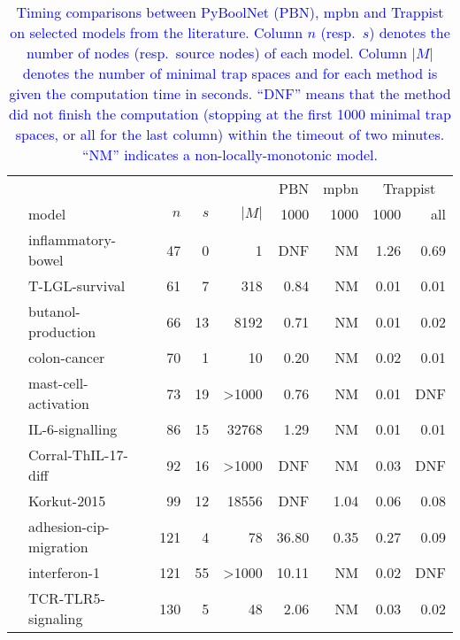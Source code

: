 \documentclass[runningheads]{llncs}
\newcounter{rownumber}
\newcommand\rownb{\stepcounter{rownumber}\arabic{rownumber}}
\newcommand{\revise}[1]{\textcolor{blue}{#1}}
\begin{document}
\begin{table}[!htb]
  \caption{\revise{Timing comparisons between PyBoolNet (PBN), mpbn and Trappist on selected models from the literature.
    Column \(n\) (resp.\ \(s\)) denotes the number of nodes (resp.\ source nodes) of each model. Column \(|M|\) denotes the number of minimal trap spaces and for each method is given the computation time in seconds.
    ``DNF'' means that the method did not finish the computation (stopping at the first 1000 minimal trap spaces, or all for the last column) within the timeout of two minutes. ``NM'' indicates a non-locally-monotonic model.}}
  \centering%
  \label{tab:result_real}
  \begin{tabular}{rlrrrrrrr}
    \toprule
    & & & & & PBN & mpbn & \multicolumn{2}{c}{Trappist} \\
    \cmidrule(lr){8-9}
    & model & \(n\) & \(s\) & \(|M|\) & 1000 & 1000 & 1000 & all \\
    \midrule
    \rownb & inflammatory-bowel~\cite{DBLP:journals/bmcsb/HelikarKMBRMWSLR12} & 47 & 0 & 1 & DNF & NM & 1.26 & 0.69\\
    \rownb & T-LGL-survival~\cite{DBLP:journals/bmcsb/HelikarKMBRMWSLR12} & 61 & 7 & 318 & 0.84 & NM & 0.01 & 0.01\\
    \rownb & butanol-production~\cite{DBLP:journals/bmcsb/HelikarKMBRMWSLR12} & 66 & 13 & 8192 & 0.71 & NM & 0.01 & 0.02\\
    \rownb & colon-cancer~\cite{DBLP:journals/bmcsb/HelikarKMBRMWSLR12} & 70 & 1 & 10 & 0.20 & NM & 0.02 & 0.01\\
    \rownb & mast-cell-activation~\cite{aghamiri2020automated} & 73 & 19 & >1000 & 0.76 & NM & 0.01 & DNF\\
    \rownb & IL-6-signalling~\cite{DBLP:journals/bmcsb/HelikarKMBRMWSLR12} & 86 & 15 & 32768 & 1.29 & NM & 0.01 & 0.01\\
    \rownb & Corral-ThIL-17-diff~\cite{corral2021interplay} & 92 & 16 & >1000 & DNF & NM & 0.03 & DNF\\
    \rownb & Korkut-2015~\cite{lee2019signal} & 99 & 12 & 18556 & DNF & 1.04 & 0.06 & 0.08\\ \midrule
    \rownb & adhesion-cip-migration~\cite{guberman2020boolean} & 121 & 4 & 78 & 36.80 & 0.35 & 0.27 & 0.09\\
    \rownb & interferon-1~\cite{ostaszewski2021covid19} & 121 & 55 & >1000 & 10.11 & NM & 0.02 & DNF\\
    \rownb & TCR-TLR5-signaling~\cite{rodriguez2019cooperation} & 130 & 5 & 48 & 2.06 & NM & 0.03 & 0.02\\

\end{tabular}
\end{table}
\end{document}
